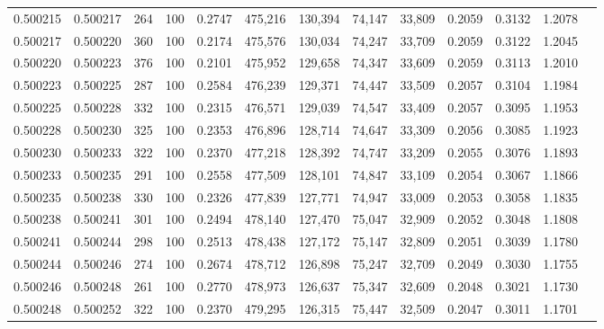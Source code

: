 \begin{tabular}{rrrrrrrrrrrrr}
0.500215 & 0.500217 &   264 & 100 &                                     0.2747 & 475,216 & 130,394 &  74,147 &  33,809 & 0.2059 & 0.3132 & 1.2078 \\
0.500217 & 0.500220 &   360 & 100 &                                     0.2174 & 475,576 & 130,034 &  74,247 &  33,709 & 0.2059 & 0.3122 & 1.2045 \\
0.500220 & 0.500223 &   376 & 100 &                                     0.2101 & 475,952 & 129,658 &  74,347 &  33,609 & 0.2059 & 0.3113 & 1.2010 \\
0.500223 & 0.500225 &   287 & 100 &                                     0.2584 & 476,239 & 129,371 &  74,447 &  33,509 & 0.2057 & 0.3104 & 1.1984 \\
0.500225 & 0.500228 &   332 & 100 &                                     0.2315 & 476,571 & 129,039 &  74,547 &  33,409 & 0.2057 & 0.3095 & 1.1953 \\
0.500228 & 0.500230 &   325 & 100 &                                     0.2353 & 476,896 & 128,714 &  74,647 &  33,309 & 0.2056 & 0.3085 & 1.1923 \\
0.500230 & 0.500233 &   322 & 100 &                                     0.2370 & 477,218 & 128,392 &  74,747 &  33,209 & 0.2055 & 0.3076 & 1.1893 \\
0.500233 & 0.500235 &   291 & 100 &                                     0.2558 & 477,509 & 128,101 &  74,847 &  33,109 & 0.2054 & 0.3067 & 1.1866 \\
0.500235 & 0.500238 &   330 & 100 &                                     0.2326 & 477,839 & 127,771 &  74,947 &  33,009 & 0.2053 & 0.3058 & 1.1835 \\
0.500238 & 0.500241 &   301 & 100 &                                     0.2494 & 478,140 & 127,470 &  75,047 &  32,909 & 0.2052 & 0.3048 & 1.1808 \\
0.500241 & 0.500244 &   298 & 100 &                                     0.2513 & 478,438 & 127,172 &  75,147 &  32,809 & 0.2051 & 0.3039 & 1.1780 \\
0.500244 & 0.500246 &   274 & 100 &                                     0.2674 & 478,712 & 126,898 &  75,247 &  32,709 & 0.2049 & 0.3030 & 1.1755 \\
0.500246 & 0.500248 &   261 & 100 &                                     0.2770 & 478,973 & 126,637 &  75,347 &  32,609 & 0.2048 & 0.3021 & 1.1730 \\
0.500248 & 0.500252 &   322 & 100 &                                     0.2370 & 479,295 & 126,315 &  75,447 &  32,509 & 0.2047 & 0.3011 & 1.1701 \\

\end{tabular}
